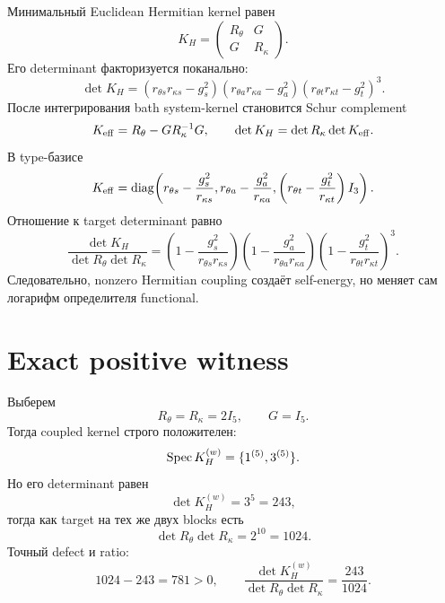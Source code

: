 Минимальный Euclidean Hermitian kernel равен
\begin{equation}
 K_H=\begin{pmatrix}R_\theta&G\\G&R_\kappa\end{pmatrix}.
 \label{eq:v9-kms-fermion-bath-hermitian-kernel}
\end{equation}
Его determinant факторизуется поканально:
\begin{equation}
 \det K_H=
 (r_{\theta s}r_{\kappa s}-g_s^2)
 (r_{\theta a}r_{\kappa a}-g_a^2)
 (r_{\theta t}r_{\kappa t}-g_t^2)^3.
 \label{eq:v9-kms-fermion-bath-full-determinant}
\end{equation}
После интегрирования bath system-kernel становится Schur complement
\begin{equation}
 K_{\rm eff}=R_\theta-GR_\kappa^{-1}G,
 \qquad
 \det K_H=\det R_\kappa\det K_{\rm eff}.
 \label{eq:v9-kms-fermion-bath-schur}
\end{equation}
В type-базисе
\begin{equation}
 K_{\rm eff}=\operatorname{diag}\!\left(
 r_{\theta s}-\frac{g_s^2}{r_{\kappa s}},
 r_{\theta a}-\frac{g_a^2}{r_{\kappa a}},
 \left(r_{\theta t}-\frac{g_t^2}{r_{\kappa t}}\right)I_3
 \right).
 \label{eq:v9-kms-fermion-bath-schur-diagonal}
\end{equation}
Отношение к target determinant равно
\begin{equation}
 \frac{\det K_H}{\det R_\theta\det R_\kappa}
 =\left(1-\frac{g_s^2}{r_{\theta s}r_{\kappa s}}\right)
  \left(1-\frac{g_a^2}{r_{\theta a}r_{\kappa a}}\right)
  \left(1-\frac{g_t^2}{r_{\theta t}r_{\kappa t}}\right)^3.
 \label{eq:v9-kms-fermion-bath-ratio}
\end{equation}
Следовательно, nonzero Hermitian coupling создаёт self-energy, но меняет
сам логарифм определителя functional.

\section{Exact positive witness}

Выберем
\begin{equation}
 R_\theta=R_\kappa=2I_5,
 \qquad G=I_5.
 \label{eq:v9-kms-fermion-bath-witness}
\end{equation}
Тогда coupled kernel строго положителен:
\begin{equation}
 \operatorname{Spec} K_H^{(w)}=\{1^{(5)},3^{(5)}\}.
 \label{eq:v9-kms-fermion-bath-witness-spectrum}
\end{equation}
Но его determinant равен
\begin{equation}
 \det K_H^{(w)}=3^5=243,
 \label{eq:v9-kms-fermion-bath-witness-determinant}
\end{equation}
тогда как target на тех же двух blocks есть
\begin{equation}
 \det R_\theta\det R_\kappa=2^{10}=1024.
 \label{eq:v9-kms-fermion-bath-witness-target}
\end{equation}
Точный defect и ratio:
\begin{equation}
 1024-243=781>0,
 \qquad
 \frac{\det K_H^{(w)}}{\det R_\theta\det R_\kappa}
 =\frac{243}{1024}.
 \label{eq:v9-kms-fermion-bath-witness-defect}
\end{equation}

